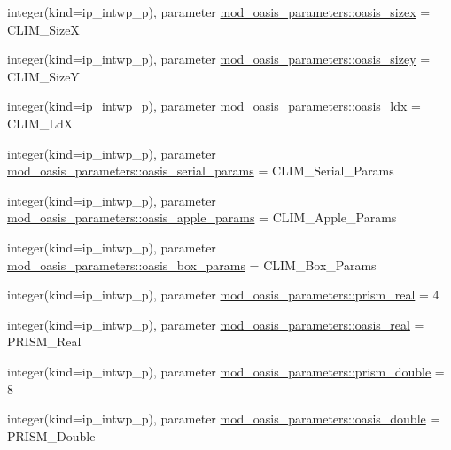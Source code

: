 \begin{DoxyCompactItemize}
\item 
integer(kind=ip\+\_\+intwp\+\_\+p), parameter \hyperlink{namespacemod__oasis__parameters_a58295a6037954bd96e350f0077810529}{mod\+\_\+oasis\+\_\+parameters\+::oasis\+\_\+sizex} = C\+L\+I\+M\+\_\+\+SizeX
\item 
integer(kind=ip\+\_\+intwp\+\_\+p), parameter \hyperlink{namespacemod__oasis__parameters_ac3441e0815500ea5d38d80a48c4c7474}{mod\+\_\+oasis\+\_\+parameters\+::oasis\+\_\+sizey} = C\+L\+I\+M\+\_\+\+SizeY
\item 
integer(kind=ip\+\_\+intwp\+\_\+p), parameter \hyperlink{namespacemod__oasis__parameters_a70aa19a7931c1ef1a371fb9be8379421}{mod\+\_\+oasis\+\_\+parameters\+::oasis\+\_\+ldx} = C\+L\+I\+M\+\_\+\+LdX
\item 
integer(kind=ip\+\_\+intwp\+\_\+p), parameter \hyperlink{namespacemod__oasis__parameters_a021091fc3ff43fdd8699d810bc18b6be}{mod\+\_\+oasis\+\_\+parameters\+::oasis\+\_\+serial\+\_\+params} = C\+L\+I\+M\+\_\+\+Serial\+\_\+\+Params
\item 
integer(kind=ip\+\_\+intwp\+\_\+p), parameter \hyperlink{namespacemod__oasis__parameters_a4e80e06d524bff6a98d2dbb856d0b92d}{mod\+\_\+oasis\+\_\+parameters\+::oasis\+\_\+apple\+\_\+params} = C\+L\+I\+M\+\_\+\+Apple\+\_\+\+Params
\item 
integer(kind=ip\+\_\+intwp\+\_\+p), parameter \hyperlink{namespacemod__oasis__parameters_a5796610110f6707828b7626f03ad93b3}{mod\+\_\+oasis\+\_\+parameters\+::oasis\+\_\+box\+\_\+params} = C\+L\+I\+M\+\_\+\+Box\+\_\+\+Params
\item 
integer(kind=ip\+\_\+intwp\+\_\+p), parameter \hyperlink{namespacemod__oasis__parameters_a02e0627219e7769df37e3d55da46f65d}{mod\+\_\+oasis\+\_\+parameters\+::prism\+\_\+real} = 4
\item 
integer(kind=ip\+\_\+intwp\+\_\+p), parameter \hyperlink{namespacemod__oasis__parameters_ae7760fcfae19d2f3cbf759688cd35193}{mod\+\_\+oasis\+\_\+parameters\+::oasis\+\_\+real} = P\+R\+I\+S\+M\+\_\+\+Real
\item 
integer(kind=ip\+\_\+intwp\+\_\+p), parameter \hyperlink{namespacemod__oasis__parameters_a9527d2d640ea7d747143bf994ee9b206}{mod\+\_\+oasis\+\_\+parameters\+::prism\+\_\+double} = 8
\item 
integer(kind=ip\+\_\+intwp\+\_\+p), parameter \hyperlink{namespacemod__oasis__parameters_a1071adbbf4c378907b4ff69dd53d0d7e}{mod\+\_\+oasis\+\_\+parameters\+::oasis\+\_\+double} = P\+R\+I\+S\+M\+\_\+\+Double
\end{DoxyCompactItemize}
